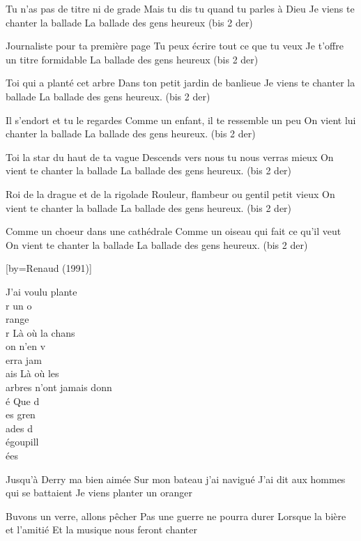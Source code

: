 \beginverse
Tu n'as pas de titre ni de grade
Mais tu dis tu quand tu parles à Dieu
Je viens te chanter la ballade
La ballade des gens heureux
(bis 2 der)
\endverse

\beginverse
Journaliste pour ta première page
Tu peux écrire tout ce que tu veux
Je t'offre un titre formidable
La ballade des gens heureux
(bis 2 der)
\endverse

\beginverse
Toi qui a planté cet arbre
Dans ton petit jardin de banlieue
Je viens te chanter la ballade
La ballade des gens heureux.
(bis 2 der)
\endverse

\beginverse
Il s'endort et tu le regardes
Comme un enfant, il te ressemble un peu
On vient lui chanter la ballade
La ballade des gens heureux.
(bis 2 der)
\endverse

\beginverse
Toi la star du haut de ta vague
Descends vers nous tu nous verras mieux
On vient te chanter la ballade
La ballade des gens heureux.
(bis 2 der)
\endverse

\beginverse
Roi de la drague et de la rigolade
Rouleur, flambeur ou gentil petit vieux
On vient te chanter la ballade
La ballade des gens heureux.
(bis 2 der)
\endverse

\beginverse
Comme un choeur dans une cathédrale
Comme un oiseau qui fait ce qu'il veut
On vient te chanter la ballade
La ballade des gens heureux.
(bis 2 der)
\endverse

[by={Renaud (1991)}]

\beginverse
J'ai voulu plante\\[Sol]r un o\\[Do]range\\[Sol]r
Là où la chans\\[Mim]on n'en v\\[Lam]erra jam\\[Ré]ais
Là où les \\[Sol]arbres n'ont jamais donn\\[Mim]é
Que d\\[Do]es gren\\[Sol]ades d\\[Do]égoupill\\[Sol]ées
\endverse

\beginverse
Jusqu'à Derry ma bien aimée
Sur mon bateau j'ai navigué
J'ai dit aux hommes qui se battaient
Je viens planter un oranger
\endverse

\beginverse
Buvons un verre, allons pêcher
Pas une guerre ne pourra durer
Lorsque la bière et l'amitié
Et la musique nous feront chanter
\endverse

